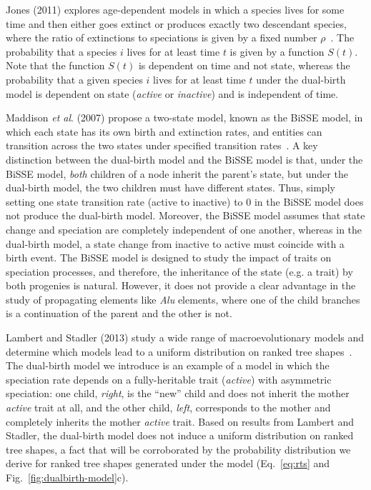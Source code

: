 Jones (2011) explores age-dependent models in which a species lives for some time and then either goes extinct or produces exactly two descendant species, where the ratio of extinctions to speciations is given by a fixed number $\rho$~\cite{Jones2011}. The probability that a species $i$ lives for at least time $t$ is given by a function $S(t)$. Note that the function $S(t)$ is dependent on time and not state, whereas the probability that a given species $i$ lives for at least time $t$ under the dual-birth model is dependent on state ({\em active} or {\em inactive}) and is independent of time.

Maddison \textit{et al}. (2007) propose a two-state model, known as the BiSSE model, in which each state has its own birth and extinction rates, and entities can transition across the two states under specified transition rates~\cite{Maddison2007}. A key distinction between the dual-birth model and the BiSSE model is that, under the BiSSE model, {\em both} children of a node inherit the parent's state, but under the dual-birth model, the two children must have different states. Thus, simply setting one state transition rate (active to inactive) to 0 in the BiSSE model does not produce the dual-birth model. Moreover, the BiSSE model assumes that state change and speciation are completely independent of one another, whereas in the dual-birth model, a state change from inactive to active must coincide with a birth event. The BiSSE model is designed to study the impact of traits on speciation processes, and therefore, the inheritance of the state (e.g. a trait) by both progenies is natural. However, it does not provide a clear advantage in  the study of propagating elements like {\em Alu} elements, where one of the child branches is a continuation of the parent and the other is not.

Lambert and Stadler (2013) study a wide range of macroevolutionary models and
determine which models lead to a uniform distribution on ranked tree shapes~\cite{Lambert2013}. The dual-birth model we introduce is an example of a model in which the speciation rate depends on a fully-heritable trait ({\em active}) with asymmetric speciation: one child, {\em right}, is the ``new'' child and does not inherit the mother {\em active} trait at all, and the other child, {\em left}, corresponds to the mother and completely inherits the mother {\em active} trait. Based on results from Lambert and Stadler, the dual-birth model does not induce a uniform distribution on ranked tree shapes, a fact that will be corroborated by the probability distribution we derive for ranked tree shapes generated under the model (Eq.~\ref{eq:rts} and Fig.~\ref{fig:dualbirth-model}c).

